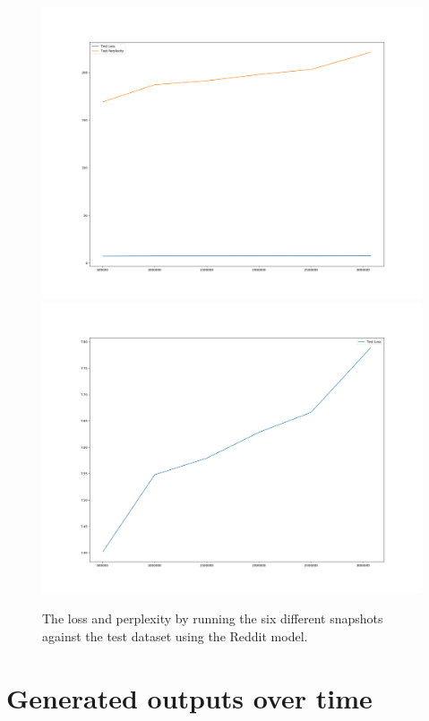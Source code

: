 \begin{figure}[H]
	\includegraphics[width=\linewidth]{img/plots/reddit/test_metrics_both.png}
	\centering
	\small
	\endminipage\hfill
	\includegraphics[width=\linewidth]{img/plots/reddit/test_metrics_loss.png}
	\centering
	\small
	\endminipage\hfill
	\caption{The loss and perplexity by running the six different snapshots against the test dataset using the Reddit model.}
	\label{result:test_performance:reddit}
\end{figure}

\section{Generated outputs over time}
\blindtext

